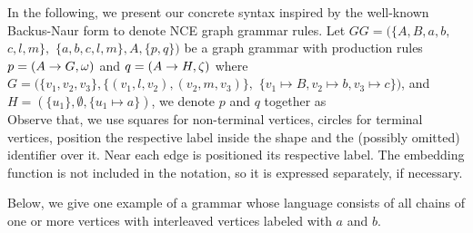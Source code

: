 \documentclass[runningheads]{llncs}
\begin{document}
In the following, we present our concrete syntax inspired by the well-known Backus-Naur form to denote NCE graph grammar rules. Let $\mathit{GG} = (\{A, B, a, b,$ $ c, l, m\},$ $\{a, b, c, l, m\}, A, \{p,q\})$ be a graph grammar with production rules $p = (A \to G,\omega)$ and $q = (A \to H,\zeta)$ where $G = (\{v_1, v_2, v_3\}, \{(v_1,l,v_2), (v_2,m,v_3)\},$ $\{v_1 \mapsto B, v_2 \mapsto b, v_3 \mapsto c \})$, and $H = (\{u_1\}, \emptyset, \{u_1 \mapsto a\})$, we denote $p$ and $q$ together as\\


Observe that, we use squares for non-terminal vertices, circles for terminal vertices, position the respective label inside the shape and the (possibly omitted) identifier over it. Near each edge is positioned its respective label. The embedding function is not included in the notation, so it is expressed separately, if necessary.

Below, we give one example of a grammar whose language consists of all chains of one or more vertices with interleaved vertices labeled with $a$ and $b$.
\end{document}
